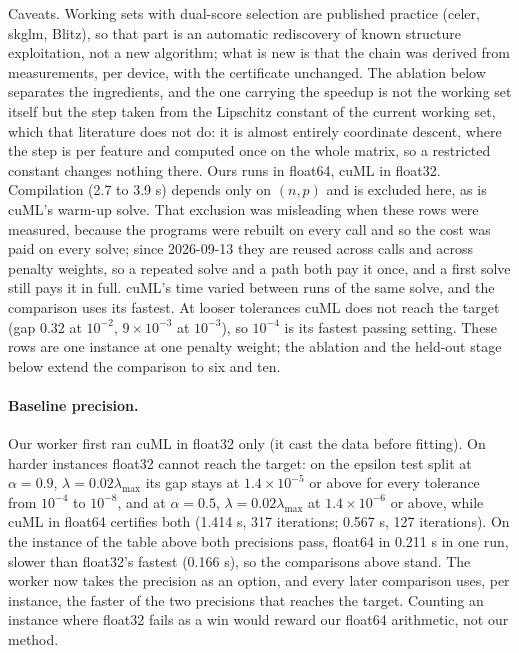 Caveats. Working sets with dual-score selection are published practice (celer,
skglm, Blitz), so that part is an automatic rediscovery of known structure
exploitation, not a new algorithm; what is new is that the chain was derived
from measurements, per device, with the certificate unchanged. The ablation
below separates the ingredients, and the one carrying the speedup is not the
working set itself but the step taken from the Lipschitz constant of the
current working set, which that literature does not do: it is almost entirely
coordinate descent, where the step is per feature and computed once on the
whole matrix, so a restricted constant changes nothing there. Ours runs in
float64, cuML in float32. Compilation (2.7 to 3.9 s) depends only on $(n, p)$
and is excluded here, as is cuML's warm-up solve. That exclusion was misleading
when these rows were measured, because the programs were rebuilt on every call
and so the cost was paid on every solve; since 2026-09-13 they are reused across
calls and across penalty weights, so a repeated solve and a path both pay it
once, and a first solve still pays it in full. cuML's time varied between runs of the same solve,
and the comparison uses its fastest. At looser tolerances cuML does not reach
the target (gap 0.32 at $10^{-2}$, $9\times10^{-3}$ at $10^{-3}$), so $10^{-4}$ is its
fastest passing setting. These rows are one instance at one penalty weight; the
ablation and the held-out stage below extend the comparison to six and ten.

\paragraph{Baseline precision.}
Our worker first ran cuML in float32 only (it cast the data before fitting). On
harder instances float32 cannot reach the target: on the epsilon test split at
$\alpha=0.9$, $\lambda=0.02\lambda_{\max}$ its gap stays at $1.4\times10^{-5}$ or
above for every tolerance from $10^{-4}$ to $10^{-8}$, and at $\alpha=0.5$,
$\lambda=0.02\lambda_{\max}$ at $1.4\times10^{-6}$ or above, while cuML in float64
certifies both (1.414 s, 317 iterations; 0.567 s, 127 iterations). On the
instance of the table above both precisions pass, float64 in 0.211 s in one
run, slower than float32's fastest (0.166 s), so the comparisons above stand. The
worker now takes the precision as an option, and every later comparison uses,
per instance, the faster of the two precisions that reaches the target. Counting
an instance where float32 fails as a win would reward our float64 arithmetic,
not our method.


